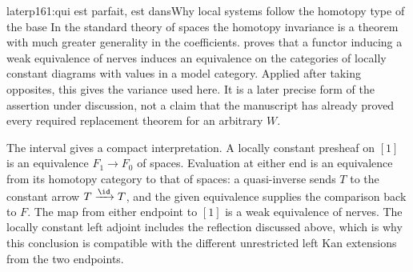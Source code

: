 \begin{dcomment}{later}{p161:qui est parfait, est dans}{Why local systems follow the homotopy type of the base}
In the standard theory of spaces the homotopy invariance is a theorem with much greater generality in the coefficients. \citet[Theorem~1.3]{Cisinski2009LocallyConstant} proves that a functor inducing a weak equivalence of nerves induces an equivalence on the categories of locally constant diagrams with values in a model category. Applied after taking opposites, this gives the variance used here. It is a later precise form of the assertion under discussion, not a claim that the manuscript has already proved every required replacement theorem for an arbitrary $W$.

The interval gives a compact interpretation. A locally constant presheaf on $[1]$ is an equivalence $F_1\to F_0$ of spaces. Evaluation at either end is an equivalence from its homotopy category to that of spaces: a quasi-inverse sends $T$ to the constant arrow $T\xrightarrow{\id}T$, and the given equivalence supplies the comparison back to $F$. The map from either endpoint to $[1]$ is a weak equivalence of nerves. The locally constant left adjoint includes the reflection discussed above, which is why this conclusion is compatible with the different unrestricted left Kan extensions from the two endpoints.
\end{dcomment}

